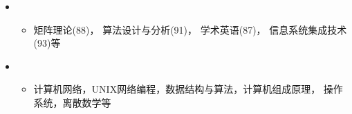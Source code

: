   \begin{itemize}[leftmargin=*]
    \item
      {%
      \begin{itemize}
        \item{	矩阵理论(88)， 	算法设计与分析(91)， 	学术英语(87)， 	信息系统集成技术(93)等}
      \end{itemize}
      }
    \item
      {%
      \begin{itemize}
        \item{计算机网络，UNIX网络编程，数据结构与算法，计算机组成原理， 操作系统，离散数学等 }
      \end{itemize}
      } 
      
  \end{itemize}
